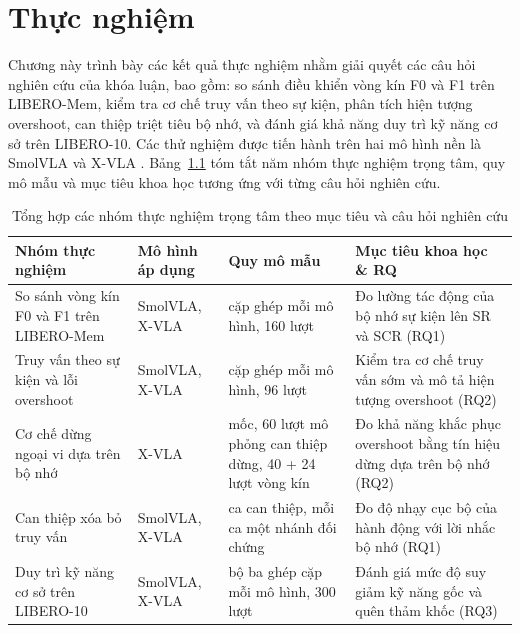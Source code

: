 \chapter{Thực nghiệm}

Chương này trình bày các kết quả thực nghiệm nhằm giải quyết các câu hỏi nghiên cứu của khóa luận, bao gồm: so sánh điều khiển vòng kín F0 và F1 trên LIBERO-Mem, kiểm tra cơ chế truy vấn theo sự kiện, phân tích hiện tượng overshoot, can thiệp triệt tiêu bộ nhớ, và đánh giá khả năng duy trì kỹ năng cơ sở trên LIBERO-10. Các thử nghiệm được tiến hành trên hai mô hình nền là SmolVLA \cite{smolvla2025} và X-VLA \cite{xvla2025}. Bảng~\ref{tab:experiment-rq-map} tóm tắt năm nhóm thực nghiệm trọng tâm, quy mô mẫu và mục tiêu khoa học tương ứng với từng câu hỏi nghiên cứu.

\begin{table}[htbp]
\centering\small
\caption{Tổng hợp các nhóm thực nghiệm trọng tâm theo mục tiêu và câu hỏi nghiên cứu}
\label{tab:experiment-rq-map}
\setlength{\tabcolsep}{4pt}
\begin{tabular}{>{\raggedright\arraybackslash}p{}|>{\raggedright\arraybackslash}p{}|>{\raggedright\arraybackslash}p{}|>{\raggedright\arraybackslash}p{}}
\toprule
\textbf{Nhóm thực nghiệm} & \textbf{Mô hình áp dụng} & \textbf{Quy mô mẫu} & \textbf{Mục tiêu khoa học \& RQ} \\
\midrule
So sánh vòng kín F0 và F1 trên LIBERO-Mem & SmolVLA, X-VLA & 40 cặp ghép mỗi mô hình, 160 lượt & Đo lường tác động của bộ nhớ sự kiện lên SR và SCR (RQ1) \\
\midrule
Truy vấn theo sự kiện và lỗi overshoot & SmolVLA, X-VLA & 24 cặp ghép mỗi mô hình, 96 lượt & Kiểm tra cơ chế truy vấn sớm và mô tả hiện tượng overshoot (RQ2) \\
\midrule
Cơ chế dừng ngoại vi dựa trên bộ nhớ & X-VLA & 35 mốc, 60 lượt mô phỏng can thiệp dừng, 40 + 24 lượt vòng kín & Đo khả năng khắc phục overshoot bằng tín hiệu dừng dựa trên bộ nhớ (RQ2) \\
\midrule
Can thiệp xóa bỏ truy vấn & SmolVLA, X-VLA & 3 ca can thiệp, mỗi ca một nhánh đối chứng & Đo độ nhạy cục bộ của hành động với lời nhắc bộ nhớ (RQ1) \\
\midrule
Duy trì kỹ năng cơ sở trên LIBERO-10 & SmolVLA, X-VLA & 50 bộ ba ghép cặp mỗi mô hình, 300 lượt & Đánh giá mức độ suy giảm kỹ năng gốc và quên thảm khốc (RQ3) \\
\bottomrule
\end{tabular}
\end{table}

